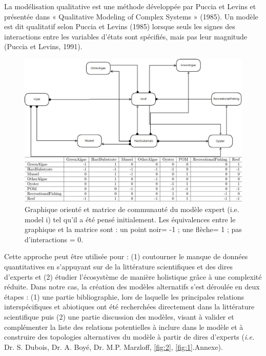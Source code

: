\documentclass[12pt]{report}
\begin{document}
La modélisation qualitative est une méthode développée par Puccia et Levins et présentée dans « Qualitative Modeling of Complex Systems » (1985). Un modèle est dit qualitatif selon Puccia et Levins (1985) lorsque seuls les signes des interactions entre les variables d’états sont spécifiés, mais pas leur magnitude (Puccia et Levins, 1991). 
\begin{figure}[t]
    \centering
    \includegraphics[width=\linewidth]{graph_and_matrix_quali_3.jpg}
    \caption[Graphique orienté et matrice de communauté du modèle expert]{Graphique orienté et matrice de communauté du modèle expert (i.e. model i) tel qu’il a été pensé initialement. Les équivalences entre le graphique et la matrice sont : un point noir= -1 ; une flèche= 1 ; pas d’interactions = 0. 
    }
    \label{fig:2}
\end{figure}
Cette approche peut être utilisée pour : (1) coutourner le manque de données quantitatives en s'appuyant sur de la littérature scientifiques et des dires d'experts et (2) étudier l’écosystème de manière holistique grâce à une complexité réduite. Dans notre cas, la création des modèles alternatifs s’est déroulée en deux étapes : (1) une partie bibliographie, lors de laquelle les principales relations interspécifiques et abiotiques ont été recherchées directement dans la littérature scientifique puis (2) une partie discussion des modèles, visant à valider et complémenter la liste des relations potentielles à inclure dans le modèle et à construire des topologies alternatives du modèle à partir de dires d’experts (\textit{i.e.} Dr. S. Dubois, Dr. A. Boyé, Dr. M.P. Marzloff, \autoref{fig:2}, \autoref{fig:1}.Annexe).\newline
\end{document}
